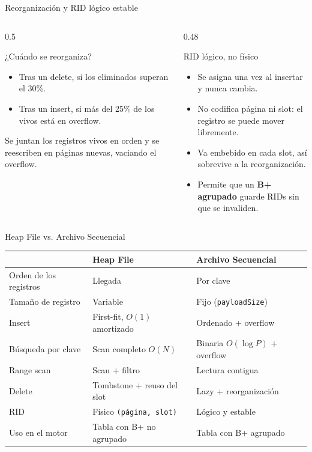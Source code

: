 \documentclass[aspectratio=169,10pt]{beamer}
\begin{document}
\begin{frame}{Reorganización y RID lógico estable}
  \begin{columns}[T]
    \begin{column}{0.5\textwidth}
      \begin{block}{¿Cuándo se reorganiza?}
        \small
        \begin{itemize}
          \item Tras un delete, si los eliminados superan el \alert{30\%}.
          \item Tras un insert, si más del \alert{25\%} de los vivos está en overflow.
        \end{itemize}
        Se juntan los registros vivos en orden y se reescriben en páginas nuevas, vaciando el overflow.
      \end{block}
    \end{column}
    \begin{column}{0.48\textwidth}
      \begin{block}{RID lógico, no físico}
        \small
        \begin{itemize}
          \item Se asigna una vez al insertar y \alert{nunca cambia}.
          \item No codifica página ni slot: el registro se puede mover libremente.
          \item Va embebido en cada slot, así sobrevive a la reorganización.
          \item Permite que un \textbf{B+ agrupado} guarde RIDs sin que se invaliden.
        \end{itemize}
      \end{block}
    \end{column}
  \end{columns}
\end{frame}

\begin{frame}{Heap File vs. Archivo Secuencial}
  \centering
  \renewcommand{\arraystretch}{1.25}
  \begin{tabular}{@{}lll@{}}
    \toprule
    & \textbf{Heap File} & \textbf{Archivo Secuencial} \\
    \midrule
    Orden de los registros & Llegada & Por clave \\
    Tamaño de registro & Variable & Fijo (\texttt{payloadSize}) \\
    Insert & First-fit, $O(1)$ amortizado & Ordenado + overflow \\
    Búsqueda por clave & Scan completo $O(N)$ & Binaria $O(\log P)$ + overflow \\
    Range scan & Scan + filtro & Lectura contigua \\
    Delete & Tombstone + reuso del slot & Lazy + reorganización \\
    RID & Físico \texttt{(página, slot)} & Lógico y estable \\
    Uso en el motor & Tabla con B+ no agrupado & Tabla con B+ agrupado \\
    \bottomrule
  \end{tabular}
\end{frame}
\end{document}
